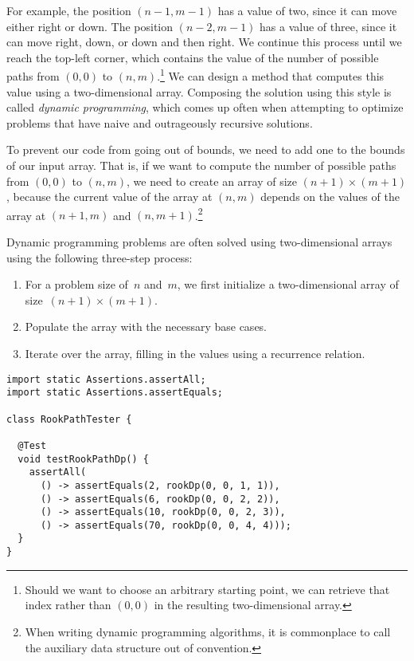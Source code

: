 For example, the position $(n - 1, m - 1)$ has a value of two, since it can move either right or down. 
The position $(n - 2, m - 1)$ has a value of three, since it can move right, down, or down and then right. 
We continue this process until we reach the top-left corner, which contains the value of the number of possible paths from $(0, 0)$ to $(n, m)$.\footnote{Should we want to choose an arbitrary starting point, we can retrieve that index rather than $(0, 0)$ in the resulting two-dimensional array.} 
We can design a method that computes this value using a two-dimensional array. 
Composing the solution using this style is called \emph{dynamic programming}, which comes up often when attempting to optimize problems that have naive and outrageously recursive solutions.

To prevent our code from going out of bounds, we need to add one to the bounds of our input array. 
That is, if we want to compute the number of possible paths from $(0, 0)$ to $(n, m)$, we need to create an array of size $(n + 1) \times (m + 1)$, because the current value of the array at $(n, m)$ depends on the values of the array at $(n + 1, m)$ and $(n, m + 1)$.\footnote{When writing dynamic programming algorithms, it is commonplace to call the auxiliary data structure  out of convention.} 

Dynamic programming problems are often solved using two-dimensional arrays using the following three-step process: 

\begin{enumerate}
  \item For a problem size of~$n$ and~$m$, we first initialize a two-dimensional array of size~$(n + 1) \times (m + 1)$.
  \item Populate the array with the necessary base cases.
  \item Iterate over the array, filling in the values using a recurrence relation.
\end{enumerate}

\begin{lstlisting}[language=MyJava]
import static Assertions.assertAll;
import static Assertions.assertEquals;

class RookPathTester {

  @Test
  void testRookPathDp() {
    assertAll(
      () -> assertEquals(2, rookDp(0, 0, 1, 1)),
      () -> assertEquals(6, rookDp(0, 0, 2, 2)),
      () -> assertEquals(10, rookDp(0, 0, 2, 3)),
      () -> assertEquals(70, rookDp(0, 0, 4, 4)));
  }
}
\end{lstlisting}

